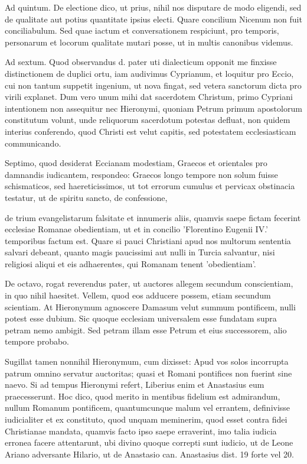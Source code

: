 Ad quintum. De electione dico, ut prius, nihil nos disputare de modo eligendi, sed de qualitate aut potius quantitate ipsius electi. Quare concilium Nicenum non fuit conciliabulum. Sed quae iactum et conversationem respiciunt, pro temporis, personarum et locorum qualitate mutari posse, ut in multis canonibus videmus.

Ad sextum. Quod observandus d. pater uti dialecticum opponit me finxisse distinctionem de duplici ortu, iam audivimus Cyprianum, et loquitur pro Eccio, cui non tantum suppetit ingenium, ut nova fingat, sed vetera sanctorum dicta pro virili explanet. Dum vero unum mihi dat sacerdotem Christum, primo Cypriani intentionem non assequitur nec Hieronymi, quoniam Petrum primum apostolorum constitutum volunt, unde reliquorum sacerdotum potestas defluat, non quidem interius conferendo, quod Christi est velut capitis, sed potestatem ecclesiasticam communicando.

Septimo, quod desiderat Eccianam modestiam, Graecos et orientales pro damnandis iudicantem, respondeo: Graecos longo tempore non solum fuisse schismaticos, sed haereticissimos, ut tot errorum cumulus et pervicax obstinacia testatur, ut de spiritu sancto, de confessione,

de trium evangelistarum falsitate et innumeris aliis, quamvis saepe fictam fecerint ecclesiae Romanae obedientiam, ut et in concilio 'Florentino Eugenii IV.' temporibus factum est. Quare si pauci Christiani apud nos multorum sententia salvari debeant, quanto magis paucissimi aut nulli in Turcia salvantur, nisi religiosi aliqui et eis adhaerentes, qui Romanam tenent 'obedientiam'.

De octavo, rogat reverendus pater, ut auctores allegem secundum conscientiam, in quo nihil haesitet. Vellem, quod eos adducere possem, etiam \marginpar{\small[270]} secundum scientiam. At Hieronymum agnoscere Damasum velut summum pontificem, nulli potest esse dubium. Sic quoque ecclesiam universalem esse fundatam supra petram nemo ambigit. Sed petram illam esse Petrum et eius successorem, alio tempore probabo.

Sugillat tamen nonnihil Hieronymum, cum dixisset: Apud vos solos incorrupta patrum omnino servatur auctoritas; quasi et Romani pontifices non fuerint sine naevo. Si ad tempus Hieronymi refert, Liberius enim et Anastasius eum praecesserunt. Hoc dico, quod merito in mentibus fidelium est admirandum, nullum Romanum pontificem, quantumcunque malum vel errantem, definivisse iudicialiter et ex constituto, quod unquam meminerim, quod esset contra fidei Christianae mandata, quamvis facto ipso saepe erraverint, imo talia iudicia erronea facere attentarunt, ubi divino quoque correpti sunt iudicio, ut de Leone Ariano adversante Hilario, ut de Anastasio can. Anastasius dist. 19 forte vel 20.

